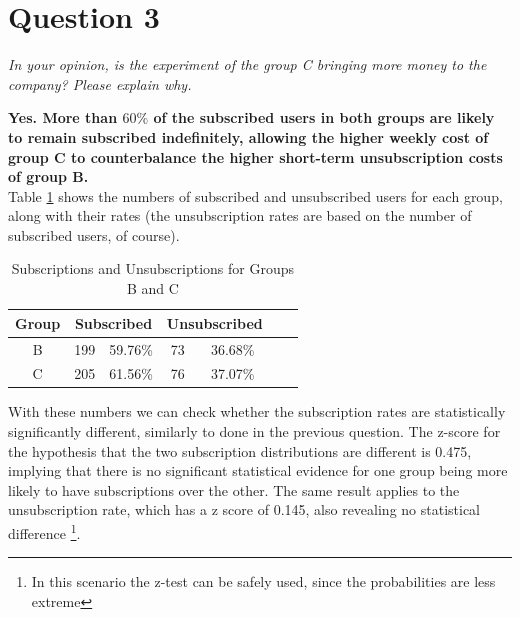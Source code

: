 \documentclass[paper=a4, fontsize=10pt]{report}
\begin{document}
\section*{Question 3}

\textit{In your opinion, is the experiment of the group C bringing more money to the company? Please explain why.}

\textbf{Yes. More than $60\%$ of the subscribed users in both groups are likely to remain subscribed indefinitely, allowing
the higher weekly cost of group C to counterbalance the higher short-term unsubscription costs of group B.}\\



Table \ref{tab:sub_unsub_rates} shows the numbers of subscribed and unsubscribed users for each group, along with their rates (the unsubscription rates are based on the number of subscribed users, of course).

\begin{table}[htbp]
\normalsize

  \centering
  \caption{Subscriptions and Unsubscriptions for Groups B and C}
    \begin{tabular}{ccccccc}
    \toprule
    \textbf{Group } & \multicolumn{2}{c}{\textbf{Subscribed}} & \multicolumn{2}{c}{\textbf{Unsubscribed}} \\
    \midrule
    B & 199  & 59.76\% & 73  & 36.68\%  \\
    C & 205   & 61.56\% & 76   & 37.07\%  \\
    \bottomrule
    \end{tabular}%
  \label{tab:sub_unsub_rates}%
\end{table}%
\normalsize

With these numbers we can check whether the subscription rates are statistically significantly different, similarly
to done in the previous question. The z-score for the hypothesis that the two subscription distributions are different is 0.475, implying that there is no significant statistical evidence for one group being more likely to have
subscriptions over the other. The same result applies to the unsubscription rate, which has a z score of 0.145, also revealing no statistical difference
\footnote{In this scenario the z-test can be safely used, since the probabilities are less extreme}.
\end{document}
